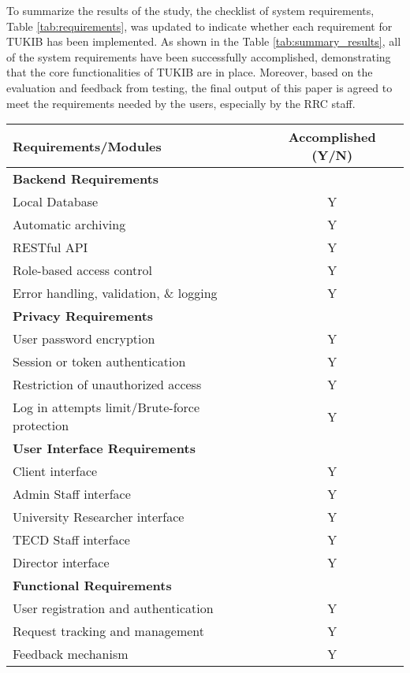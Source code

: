 To summarize the results of the study, the checklist of system requirements, Table \ref{tab:requirements}, was updated to indicate whether each requirement for TUKIB has been implemented. As shown in the Table \ref{tab:summary_results}, all of the system requirements have been successfully accomplished, demonstrating that the core functionalities of TUKIB are in place. Moreover, based on the evaluation and feedback from testing, the final output of this paper is agreed to meet the requirements needed by the users, especially by the RRC staff. \newline

\begin{table}[ht]
	\centering
	\begin{tabular}{|p{10cm}|c|}
		\hline
		\textbf{Requirements/Modules} & \textbf{Accomplished (Y/N)} \\
		\hline
		\multicolumn{2}{|l|}{\textbf{Backend Requirements}} \\
		\hline
		Local Database & Y \\
		Automatic archiving & Y \\
		RESTful API & Y \\
		Role-based access control & Y \\
		Error handling, validation, \& logging & Y \\
		\hline
		\multicolumn{2}{|l|}{\textbf{Privacy Requirements}} \\
		\hline
		User password encryption & Y \\
		Session or token authentication & Y \\
		Restriction of unauthorized access & Y \\
		Log in attempts limit/Brute-force protection & Y \\
		\hline
		\multicolumn{2}{|l|}{\textbf{User Interface Requirements}} \\
		\hline
		Client interface & Y \\
		Admin Staff interface & Y \\
		University Researcher interface & Y \\
		TECD Staff interface & Y \\
		Director interface & Y \\
		\hline
		\multicolumn{2}{|l|}{\textbf{Functional Requirements}} \\
		\hline
		User registration and authentication & Y \\
		Request tracking and management & Y \\
		Feedback mechanism & Y \\

\end{tabular}
\end{table}
